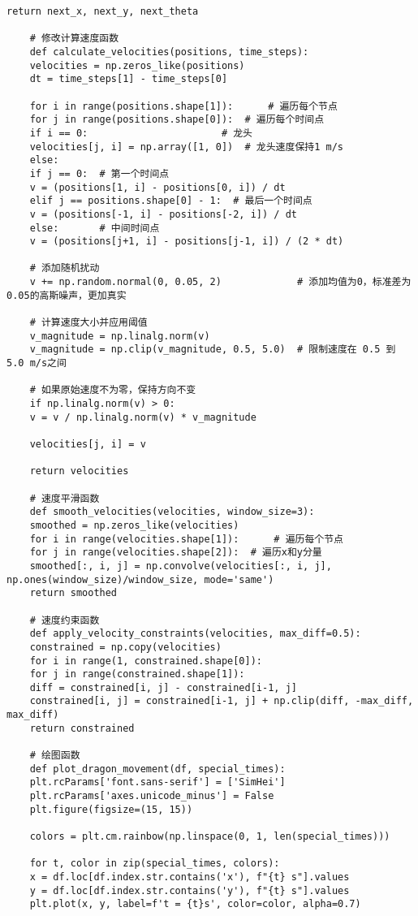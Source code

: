 \begin{lstlisting}[caption={问题一处理代码1}]
	return next_x, next_y, next_theta
	
	# 修改计算速度函数
	def calculate_velocities(positions, time_steps):
	velocities = np.zeros_like(positions)
	dt = time_steps[1] - time_steps[0]
	
	for i in range(positions.shape[1]):      # 遍历每个节点
	for j in range(positions.shape[0]):  # 遍历每个时间点
	if i == 0:                       # 龙头
	velocities[j, i] = np.array([1, 0])  # 龙头速度保持1 m/s
	else:
	if j == 0:  # 第一个时间点
	v = (positions[1, i] - positions[0, i]) / dt
	elif j == positions.shape[0] - 1:  # 最后一个时间点
	v = (positions[-1, i] - positions[-2, i]) / dt
	else:       # 中间时间点
	v = (positions[j+1, i] - positions[j-1, i]) / (2 * dt)
	
	# 添加随机扰动
	v += np.random.normal(0, 0.05, 2)             # 添加均值为0，标准差为0.05的高斯噪声，更加真实
	
	# 计算速度大小并应用阈值
	v_magnitude = np.linalg.norm(v)
	v_magnitude = np.clip(v_magnitude, 0.5, 5.0)  # 限制速度在 0.5 到 5.0 m/s之间
	
	# 如果原始速度不为零，保持方向不变
	if np.linalg.norm(v) > 0:
	v = v / np.linalg.norm(v) * v_magnitude
	
	velocities[j, i] = v
	
	return velocities
	
	# 速度平滑函数
	def smooth_velocities(velocities, window_size=3):
	smoothed = np.zeros_like(velocities)
	for i in range(velocities.shape[1]):      # 遍历每个节点
	for j in range(velocities.shape[2]):  # 遍历x和y分量
	smoothed[:, i, j] = np.convolve(velocities[:, i, j], np.ones(window_size)/window_size, mode='same')
	return smoothed
	
	# 速度约束函数
	def apply_velocity_constraints(velocities, max_diff=0.5):
	constrained = np.copy(velocities)
	for i in range(1, constrained.shape[0]):
	for j in range(constrained.shape[1]):
	diff = constrained[i, j] - constrained[i-1, j]
	constrained[i, j] = constrained[i-1, j] + np.clip(diff, -max_diff, max_diff)
	return constrained
	
	# 绘图函数
	def plot_dragon_movement(df, special_times):
	plt.rcParams['font.sans-serif'] = ['SimHei']
	plt.rcParams['axes.unicode_minus'] = False
	plt.figure(figsize=(15, 15))
	
	colors = plt.cm.rainbow(np.linspace(0, 1, len(special_times)))
	
	for t, color in zip(special_times, colors):
	x = df.loc[df.index.str.contains('x'), f"{t} s"].values
	y = df.loc[df.index.str.contains('y'), f"{t} s"].values
	plt.plot(x, y, label=f't = {t}s', color=color, alpha=0.7)
	

\end{lstlisting}

